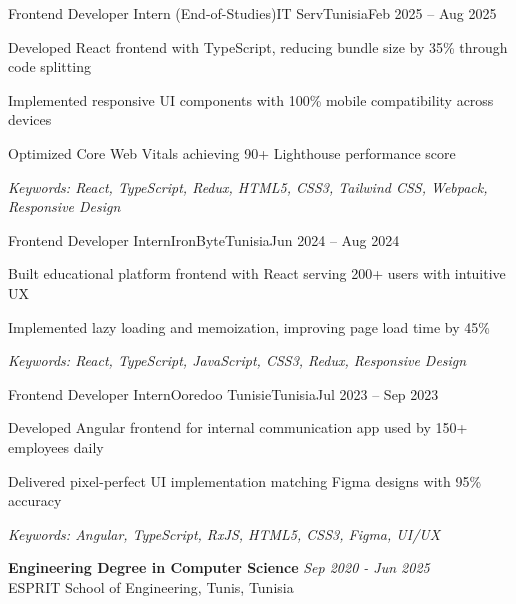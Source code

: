 \documentclass[11pt,a4paper]{article}
\begin{document}
\makecvheader
\makecontactinfo


\begin{internship}{Frontend Developer Intern (End-of-Studies)}{IT Serv}{Tunisia}{Feb 2025 -- Aug 2025}{}
  \item Developed React frontend with TypeScript, reducing bundle size by 35\% through code splitting
  \item Implemented responsive UI components with 100\% mobile compatibility across devices
  \item Optimized Core Web Vitals achieving 90+ Lighthouse performance score
  \item[] \textit{\footnotesize Keywords: React, TypeScript, Redux, HTML5, CSS3, Tailwind CSS, Webpack, Responsive Design}
\end{internship}

\begin{internship}{Frontend Developer Intern}{IronByte}{Tunisia}{Jun 2024 -- Aug 2024}{}
  \item Built educational platform frontend with React serving 200+ users with intuitive UX
  \item Implemented lazy loading and memoization, improving page load time by 45\%
  \item[] \textit{\footnotesize Keywords: React, TypeScript, JavaScript, CSS3, Redux, Responsive Design}
\end{internship}

\begin{internship}{Frontend Developer Intern}{Ooredoo Tunisie}{Tunisia}{Jul 2023 -- Sep 2023}{}
  \item Developed Angular frontend for internal communication app used by 150+ employees daily
  \item Delivered pixel-perfect UI implementation matching Figma designs with 95\% accuracy
  \item[] \textit{\footnotesize Keywords: Angular, TypeScript, RxJS, HTML5, CSS3, Figma, UI/UX}
\end{internship}

\textbf{Engineering Degree in Computer Science} \hfill \textit{Sep 2020 - Jun 2025}\\[-2pt]
ESPRIT School of Engineering, Tunis, Tunisia
\end{document}
